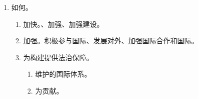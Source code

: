 \begin{enumerate}
\begin{enumerate}
\begin{enumerate}
                  \item {}全方位，深入，
                  \item 我国日益世界，深度进程，。
                  \item {}我国国家利益和合法权益的任务。。
                  \item 统推内法外治，协调推进，
                        \begin{enumerate}
                          \item 是，
                          \item 是建立以的客观需要，
                          \item 是维护国家主权、安全、发展利益的。
                        \end{enumerate}
                \end{enumerate}
          \item 如何。
                \begin{enumerate}
                  \item 加快。、加强、加强建设。
                  \item 加强。积极参与国际、发展对外、加强国际合作和国际。
                  \item 为构建提供法治保障。
                        \begin{enumerate}
                          \item 维护的国际体系。
                          \item 为贡献。
                        \end{enumerate}
                \end{enumerate}
        \end{enumerate}
\end{enumerate}